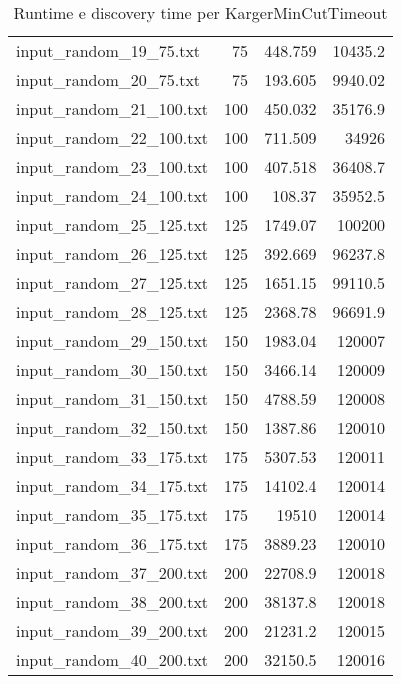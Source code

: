 \begin{table}[H]
\begin{tabular}{lrrr}
     input\_random\_19\_75.txt  &      75 &          448.759 &      10435.2   \\
     input\_random\_20\_75.txt  &      75 &          193.605 &       9940.02  \\
     input\_random\_21\_100.txt &     100 &          450.032 &      35176.9   \\
     input\_random\_22\_100.txt &     100 &          711.509 &      34926     \\
     input\_random\_23\_100.txt &     100 &          407.518 &      36408.7   \\
     input\_random\_24\_100.txt &     100 &          108.37  &      35952.5   \\
     input\_random\_25\_125.txt &     125 &         1749.07  &     100200     \\
     input\_random\_26\_125.txt &     125 &          392.669 &      96237.8   \\
     input\_random\_27\_125.txt &     125 &         1651.15  &      99110.5   \\
     input\_random\_28\_125.txt &     125 &         2368.78  &      96691.9   \\
     input\_random\_29\_150.txt &     150 &         1983.04  &     120007     \\
     input\_random\_30\_150.txt &     150 &         3466.14  &     120009     \\
     input\_random\_31\_150.txt &     150 &         4788.59  &     120008     \\
     input\_random\_32\_150.txt &     150 &         1387.86  &     120010     \\
     input\_random\_33\_175.txt &     175 &         5307.53  &     120011     \\
     input\_random\_34\_175.txt &     175 &        14102.4   &     120014     \\
     input\_random\_35\_175.txt &     175 &        19510     &     120014     \\
     input\_random\_36\_175.txt &     175 &         3889.23  &     120010     \\
     input\_random\_37\_200.txt &     200 &        22708.9   &     120018     \\
     input\_random\_38\_200.txt &     200 &        38137.8   &     120018     \\
     input\_random\_39\_200.txt &     200 &        21231.2   &     120015     \\
     input\_random\_40\_200.txt &     200 &        32150.5   &     120016     \\
     \hline
    \end{tabular}

    \caption{Runtime e discovery time per KargerMinCutTimeout}
    \label{table:kargertimeout-running-time}
\end{table}
